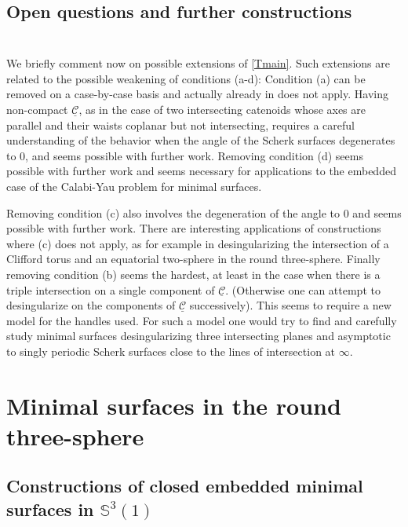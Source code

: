 \documentclass[12pt,namelimits,sumlimits]{amsart}
\theoremstyle{remark}
\numberwithin{equation}{section}
\begin{document}
\subsection*{Open questions and further constructions}
$\phantom{ab}$
\nopagebreak

We briefly comment now on possible extensions of \ref{Tmain}.
Such extensions are related to the possible weakening of conditions (a-d):
Condition (a) can be removed on a case-by-case basis and
actually already in \cite{kapouleas:finite} does not apply.
Having non-compact ${\underline{{\mathcal{C}}}}$, as in the case of two intersecting catenoids
whose axes are parallel and their waists coplanar but not intersecting,
requires a careful understanding of the behavior when the angle of the Scherk surfaces
degenerates to $0$,
and seems possible with further work.
Removing condition (d) seems possible with further work and seems necessary for applications
to the embedded case of the Calabi-Yau problem for minimal surfaces.

Removing condition (c) also involves the degeneration of the angle to $0$ and seems possible with further work.
There are interesting applications of constructions where (c) does not apply,
as for example in desingularizing the intersection of a Clifford torus and an equatorial two-sphere in the round three-sphere.
Finally removing condition (b) seems the hardest, at least in the case when there is a triple intersection on a single component
of ${\underline{{\mathcal{C}}}}$. (Otherwise one can attempt to desingularize on the components of ${\underline{{\mathcal{C}}}}$ successively).
This seems to require a new model for the handles used.
For such a model 
one would try to find and carefully study
minimal surfaces desingularizing three intersecting planes and asymptotic to singly periodic Scherk surfaces
close to the lines of intersection at $\infty$.

\section{Minimal surfaces in the round three-sphere}
\label{Ssph}
\nopagebreak

\subsection*{Constructions of closed embedded minimal surfaces in ${\mathbb{S}}^3(1)$}
$\phantom{ab}$
\nopagebreak
\end{document}
